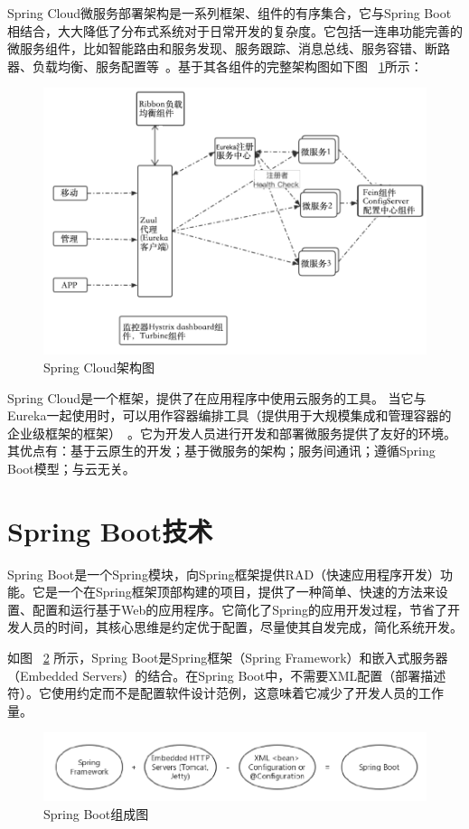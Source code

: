 Spring Cloud微服务部署架构是一系列框架、组件的有序集合，它与Spring Boot相结合，大大降低了分布式系统对于日常开发的复杂度。它包括一连串功能完善的微服务组件，比如智能路由和服务发现、服务跟踪、消息总线、服务容错、断路器、负载均衡、服务配置等~\cite{hqw2019}。基于其各组件的完整架构图如下图
~\ref{fig_springCloudCH2}所示：
\begin{figure}[htbp!]
    \centering
    \includegraphics[width=5in]{FIGs/chapter2/springCloud.pdf}
    \caption{Spring Cloud架构图}\label{fig_springCloudCH2}
\end{figure}

Spring Cloud是一个框架，提供了在应用程序中使用云服务的工具。 当它与Eureka一起使用时，可以用作容器编排工具（提供用于大规模集成和管理容器的企业级框架的框架）~\cite{mys}。它为开发人员进行开发和部署微服务提供了友好的环境。其优点有：基于云原生的开发；基于微服务的架构；服务间通讯；遵循Spring Boot模型；与云无关。

\section{Spring Boot技术}
Spring Boot是一个Spring模块，向Spring框架提供RAD（快速应用程序开发）功能。它是一个在Spring框架顶部构建的项目，提供了一种简单、快速的方法来设置、配置和运行基于Web的应用程序。它简化了Spring的应用开发过程，节省了开发人员的时间，其核心思维是约定优于配置，尽量使其自发完成，简化系统开发。

如图
~\ref{fig_springBootCH2}
所示，Spring Boot是Spring框架（Spring Framework）和嵌入式服务器（Embedded Servers）的结合。在Spring Boot中，不需要XML配置（部署描述符）。它使用约定而不是配置软件设计范例，这意味着它减少了开发人员的工作量。
\begin{figure}[htbp!]
    \centering
    \includegraphics[width=5in]{FIGs/chapter2/springBoot.pdf}
    \caption{Spring Boot组成图}\label{fig_springBootCH2}
\end{figure}

